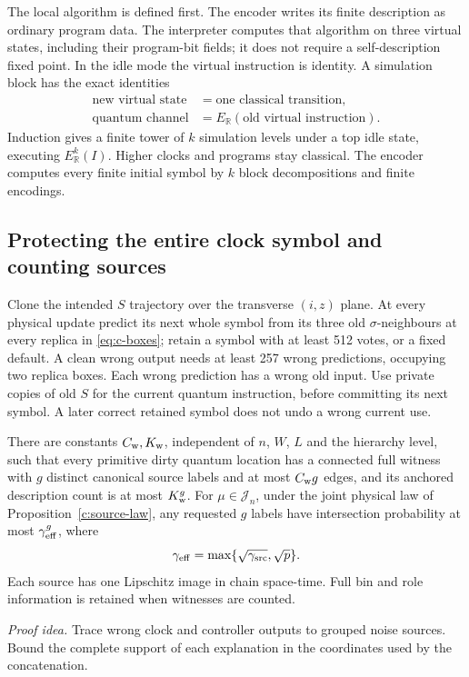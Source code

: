 The local algorithm is defined first. The encoder writes its finite
description as ordinary program data. The interpreter computes that
algorithm on three virtual states, including their program-bit fields;
it does not require a self-description fixed point. In the idle mode
the virtual instruction is identity. A simulation block has the exact
identities
\[
 \begin{aligned}
 \text{new virtual state}&=\text{one classical transition},\\
 \text{quantum channel}&=E_{\mathbb R}(\text{old virtual instruction}).
 \end{aligned}
\]
Induction gives a finite tower of \(k\) simulation levels under a top
idle state, executing \(E_{\mathbb R}^k(I)\). Higher clocks and
programs stay classical. The encoder computes every finite initial symbol by \(k\) block decompositions and finite encodings.

\subsection{Protecting the entire clock symbol and counting sources}
Clone the intended \(S\) trajectory over the transverse \((i,z)\)
plane. At every physical update predict its next whole symbol from
its three old \(\sigma\)-neighbours at every replica in
\eqref{eq:c-boxes}; retain a symbol with at least 512 votes, or a
fixed default. A clean wrong output needs at least 257 wrong
predictions, occupying two replica boxes. Each wrong prediction
has a wrong old input. Use private copies of old \(S\) for the
current quantum instruction, before committing its next symbol.
A later correct retained symbol does not undo a wrong current use.

\begin{lemma}\label{d:sources}
There are constants \(C_{\rm w},K_{\rm w}\), independent of \(n\), \(W\),
\(L\) and the hierarchy level, such that every primitive dirty quantum
location has a connected full witness with \(g\) distinct canonical source
labels and at most \(C_{\rm w}g\) edges, and its anchored description
count is at most \(K_{\rm w}^g\). For \(\mu\in\mathcal J_n\), under the
joint physical law of Proposition~\ref{c:source-law}, any requested \(g\) labels have
intersection probability at most \(\gamma_{\rm eff}^g\), where
\[
 \gamma_{\rm eff}=\max\{\sqrt{\gamma_{\rm src}},\sqrt p\}.
\]
Each source has one Lipschitz image in chain space-time. Full bin
and role information is retained when witnesses are counted.
\end{lemma}
\par\noindent\emph{Proof idea.} Trace wrong clock and controller outputs to grouped noise sources. Bound the complete support of each explanation in the coordinates used by the concatenation.

